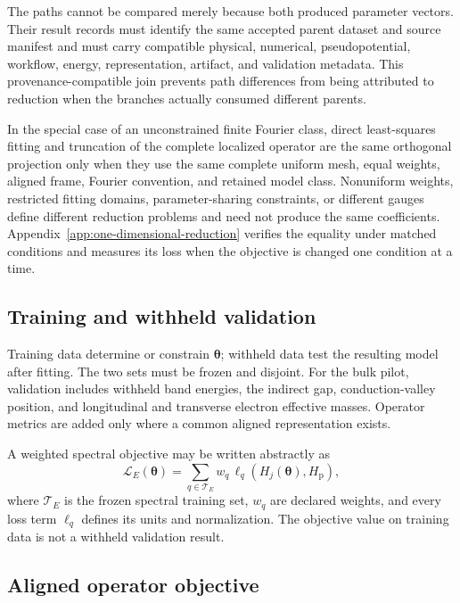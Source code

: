The paths cannot be compared merely because both produced parameter vectors.
Their result records must identify the same accepted parent dataset and source
manifest and must carry compatible physical, numerical, pseudopotential,
workflow, energy, representation, artifact, and validation metadata. This
provenance-compatible join prevents path differences from being attributed to
reduction when the branches actually consumed different parents.

In the special case of an unconstrained finite Fourier class, direct
least-squares fitting and truncation of the complete localized operator are the
same orthogonal projection only when they use the same complete uniform mesh,
equal weights, aligned frame, Fourier convention, and retained model class.
Nonuniform weights, restricted fitting domains, parameter-sharing constraints,
or different gauges define different reduction problems and need not produce
the same coefficients. Appendix~\ref{app:one-dimensional-reduction} verifies
the equality under matched conditions and measures its loss when the objective
is changed one condition at a time.

\subsection{Training and withheld validation}


Training data determine or constrain $\boldsymbol\theta$; withheld data test the
resulting model after fitting. The two sets must be frozen and disjoint. For the
bulk pilot, validation includes withheld band energies, the indirect gap,
conduction-valley position, and longitudinal and transverse electron effective
masses. Operator metrics are added only where a common aligned representation
exists.

A weighted spectral objective may be written abstractly as
\begin{equation}
  \mathcal L_E(\boldsymbol\theta)
  =
  \sum_{q\in\mathcal T_E}
  w_q\,
  \ell_q\!\left(
    H_j(\boldsymbol\theta),H_{\mathrm p}
  \right),
\end{equation}
where $\mathcal T_E$ is the frozen spectral training set, $w_q$ are declared
weights, and every loss term $\ell_q$ defines its units and normalization. The
objective value on training data is not a withheld validation result.

\subsection{Aligned operator objective}


